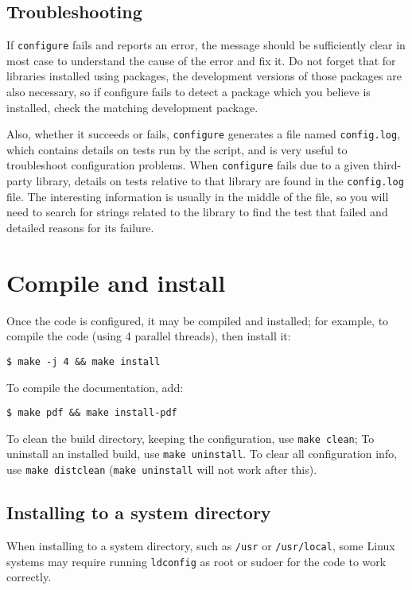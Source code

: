 \documentclass[a4paper,10pt,twoside]{csshortdoc}
\begin{document}
\subsection{Troubleshooting\label{sec:config:troubleshoot}}

If \texttt{configure} fails and reports an error, the message should
be sufficiently clear in most case to understand the cause of the
error and fix it. Do not forget that for libraries installed using
packages, the development versions of those packages are also
necessary, so if configure fails to detect a package which you
believe is installed, check the matching development package.

Also, whether it succeeds or fails, \texttt{configure} generates
a file named \texttt{config.log}, which contains details on tests
run by the script, and is very useful to troubleshoot
configuration problems. When \texttt{configure} fails due to a given
third-party library, details on tests relative to that library
are found in the \texttt{config.log} file. The interesting information
is usually in the middle of the file, so you will need to search
for strings related to the library to find the test that failed
and detailed reasons for its failure.

\section{Compile and install\label{sec:compile}}

Once the code is configured, it may be compiled and installed;
for example, to compile the code (using 4 parallel threads),
then install it:

\texttt{\$ make -j 4 \&\& make install}

To compile the documentation, add:

\texttt{\$ make pdf \&\& make install-pdf}

To clean the build directory, keeping the configuration,
use \texttt{make clean};
To uninstall an installed build, use \texttt{make uninstall}.
To clear all configuration info, use \texttt{make distclean}
(\texttt{make uninstall} will not work after this).

\subsection{Installing to a system directory\label{sec:sys_install}}

When installing to a system directory, such as \texttt{/usr}
or \texttt{/usr/local}, some Linux systems may require running
\texttt{ldconfig} as root or sudoer for the code to work correctly.
\end{document}
